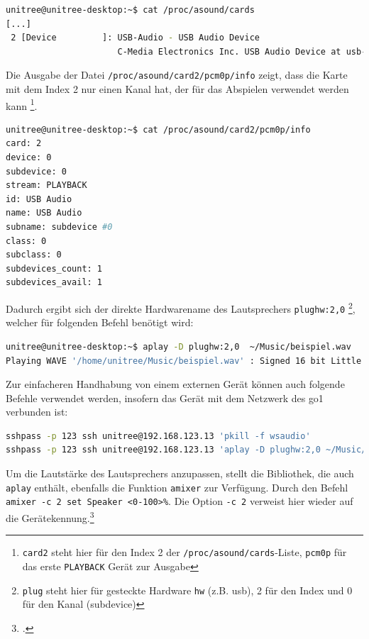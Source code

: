 \begin{lstlisting}[language=Bash]
unitree@unitree-desktop:~$ cat /proc/asound/cards
[...]
 2 [Device         ]: USB-Audio - USB Audio Device
                      C-Media Electronics Inc. USB Audio Device at usb-70090000.xusb-3.4, full speed
\end{lstlisting}

\noindent Die Ausgabe der Datei \texttt{/proc/\allowbreak asound/\allowbreak card2/\allowbreak pcm0p/\allowbreak info}
zeigt, dass die Karte mit dem Index \num{2} nur einen Kanal hat, der für das Abspielen verwendet werden kann
\footnote{\texttt{card2} steht hier für den Index \num{2} der \texttt{/proc/asound/cards}-Liste, \texttt{pcm0p} für das erste \texttt{PLAYBACK} Gerät zur Ausgabe}.

\begin{lstlisting}[language=Bash]
unitree@unitree-desktop:~$ cat /proc/asound/card2/pcm0p/info
card: 2
device: 0
subdevice: 0
stream: PLAYBACK
id: USB Audio
name: USB Audio
subname: subdevice #0
class: 0
subclass: 0
subdevices_count: 1
subdevices_avail: 1
\end{lstlisting}

\noindent Dadurch ergibt sich der direkte Hardwarename des Lautsprechers \texttt{plughw:2,0}
\footnote{\texttt{plug} steht hier für gesteckte Hardware \texttt{hw} (z.B. \gls{usb}), \num{2} für den Index und \num{0} für den Kanal (subdevice)},
welcher für folgenden Befehl benötigt wird:

\begin{lstlisting}[language=Bash]
unitree@unitree-desktop:~$ aplay -D plughw:2,0  ~/Music/beispiel.wav
Playing WAVE '/home/unitree/Music/beispiel.wav' : Signed 16 bit Little Endian, Rate 44100 Hz, Stereo
\end{lstlisting}

\noindent Zur einfacheren Handhabung von einem externen Gerät können auch folgende Befehle verwendet werden, insofern das Gerät mit dem Netzwerk
des \gls{go1} verbunden ist:

\begin{lstlisting}[language=Bash]
sshpass -p 123 ssh unitree@192.168.123.13 'pkill -f wsaudio'
sshpass -p 123 ssh unitree@192.168.123.13 'aplay -D plughw:2,0 ~/Music/beispiel.wav'
\end{lstlisting}

\noindent Um die Lautstärke des Lautsprechers anzupassen, stellt die Bibliothek, die auch \texttt{aplay} enthält, ebenfalls die
Funktion \texttt{amixer} zur Verfügung.
Durch den Befehl \texttt{amixer -c 2 set Speaker <0-100>\%}.
Die Option \texttt{-c 2} verweist hier wieder auf die Gerätekennung.\footcite{alsa}
